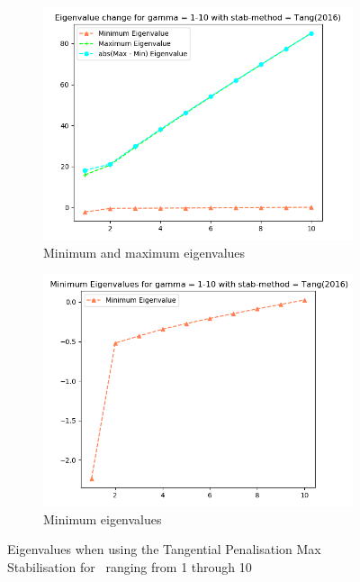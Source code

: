 \begin{figure}[ht]
     \centering
     \begin{subfigure}[h]{0.49\textwidth}
        \centering
\includegraphics[width=\textwidth]{latex/Thesis/media/Gamma_1_thru_10_tang(2016).png}
\caption{Minimum and maximum eigenvalues\label{fig:TangMaxEigLow}}
     \end{subfigure}
     \hfill
     \begin{subfigure}[h]{0.49\textwidth}
\centering
\includegraphics[width=\textwidth]{latex/Thesis/media/Gamma_1_thru_10_tang(2016)_min.png}
\caption{Minimum eigenvalues\label{fig:TangMaxEigLowMin}}
     \end{subfigure}
        \caption{Eigenvalues when using the Tangential Penalisation Max Stabilisation for \mgamma~ranging from 1 through 10}
        \label{fig:TangMaxEigLowmulti}
\end{figure}
